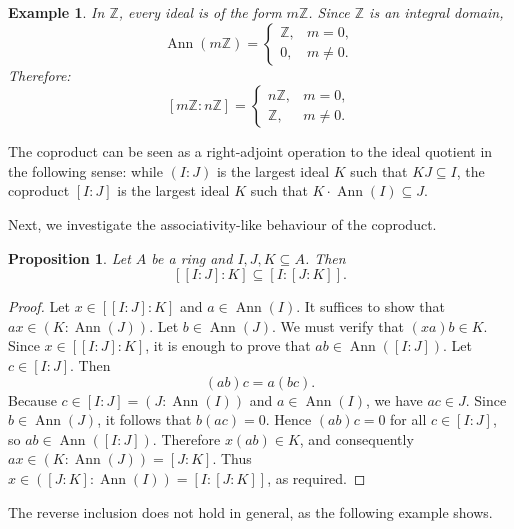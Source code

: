 \documentclass{amsart}
\newtheorem{proposition}{Proposition}
\newtheorem{example}{Example}
\DeclareMathOperator{\ann}{Ann}
\begin{document}
\begin{example}\label{ex:coproduct-Z}
In $\mathbb{Z}$, every ideal is of the form $m\mathbb{Z}$. Since $\mathbb{Z}$ is an integral domain,
\[
\ann(m\mathbb{Z})=
\begin{cases}
\mathbb{Z}, & m=0,\\
0, & m\neq 0.
\end{cases}
\]
Therefore:
\[
[m\mathbb{Z}:n\mathbb{Z}]=
\begin{cases}
n\mathbb{Z}, & m=0,\\[4pt]
\mathbb{Z}, & m\neq 0.
\end{cases}
\]
\end{example}

The coproduct can be seen as a right-adjoint operation to the ideal quotient in the following sense: while $(I:J)$ is the largest ideal $K$ such that $KJ\subseteq I$, the coproduct $[I:J]$ is the largest ideal $K$ such that $K\cdot \ann(I)\subseteq J$.

Next, we investigate the associativity-like behaviour of the coproduct.

\begin{proposition}\label{prop:coproduct-associative}
Let $A$ be a ring and $I,J,K\subseteq A$. Then
\[
[[I:J]:K] \subseteq [I:[J:K]].
\]
\end{proposition}

\begin{proof}
Let $x\in [[I:J]:K]$ and $a\in \ann(I)$. It suffices to show that $ax\in (K:\ann(J))$. Let $b\in \ann(J)$. We must verify that $(xa)b\in K$. Since $x\in [[I:J]:K]$, it is enough to prove that $ab\in \ann([I:J])$. Let $c\in [I:J]$. Then
\[
(ab)c = a(bc).
\]
Because $c\in [I:J]=(J:\ann(I))$ and $a\in \ann(I)$, we have $ac\in J$. Since $b\in \ann(J)$, it follows that $b(ac)=0$. Hence $(ab)c=0$ for all $c\in [I:J]$, so $ab\in \ann([I:J])$. Therefore $x(ab)\in K$, and consequently $ax\in (K:\ann(J))=[J:K]$. Thus $x\in ([J:K]:\ann(I))=[I:[J:K]]$, as required.
\end{proof}

The reverse inclusion does not hold in general, as the following example shows.
\end{document}
